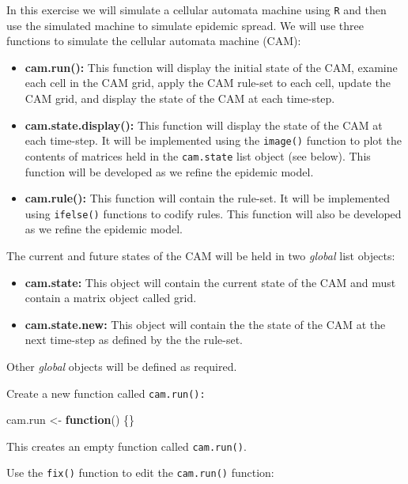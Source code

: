 \documentclass[
  12pt,
  a4paper]{book}
\newenvironment{Shaded}{\begin{snugshade}}{\end{snugshade}}
\newcommand{\ControlFlowTok}[1]{\textcolor[rgb]{0.13,0.29,0.53}{\textbf{#1}}}
\newcommand{\NormalTok}[1]{#1}
\newcommand{\OtherTok}[1]{\textcolor[rgb]{0.56,0.35,0.01}{#1}}
\begin{document}
In this exercise we will simulate a cellular automata machine using \texttt{R} and then use the simulated machine to simulate epidemic spread. We will use three functions to simulate the cellular automata machine (CAM):

\begin{itemize}
\item
  \textbf{cam.run():} This function will display the initial state of the CAM, examine each cell in the CAM grid, apply the CAM rule-set to each cell, update the CAM grid, and display the state of the CAM at each time-step.
\item
  \textbf{cam.state.display():} This function will display the state of the CAM at each time-step. It will be implemented using the \texttt{image()} function to plot the contents of matrices held in the \texttt{cam.state} list object (see below). This function will be developed as we refine the epidemic model.
\item
  \textbf{cam.rule():} This function will contain the rule-set. It will be implemented using \texttt{ifelse()} functions to codify rules. This function will also be developed as we refine the epidemic model.
\end{itemize}

The current and future states of the CAM will be held in two \emph{global} list objects:

\begin{itemize}
\item
  \textbf{cam.state:} This object will contain the current state of the CAM and must contain a matrix object
  called grid.
\item
  \textbf{cam.state.new:} This object will contain the the state of the CAM at the next time-step as defined
  by the the rule-set.
\end{itemize}

Other \emph{global} objects will be defined as required.

Create a new function called \texttt{cam.run():}

\begin{Shaded}
\begin{Highlighting}[]
\NormalTok{cam.run }\OtherTok{\textless{}{-}} \ControlFlowTok{function}\NormalTok{() \{\}}
\end{Highlighting}
\end{Shaded}

This creates an empty function called \texttt{cam.run()}.

Use the \texttt{fix()} function to edit the \texttt{cam.run()} function:
\end{document}

